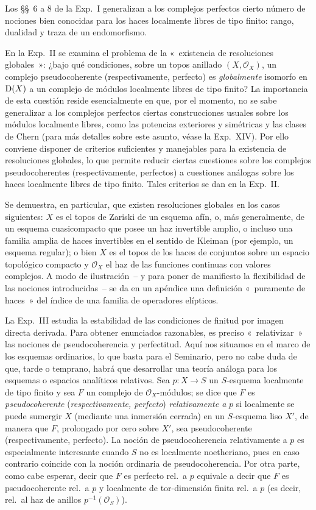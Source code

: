 Los §§~6 a 8 de la Exp.\ I generalizan a los complejos perfectos cierto número de nociones bien conocidas para los haces localmente libres de tipo finito: rango, dualidad y traza de un endomorfismo.

En la Exp.\ II se examina el problema de la «~existencia de resoluciones globales~»: ¿bajo qué condiciones, sobre un topos anillado \((X,\mathcal O_X)\), un complejo pseudocoherente (respectivamente, perfecto) es \emph{globalmente} isomorfo en \(\mathrm D(X)\) a un complejo de módulos localmente libres de tipo finito? La importancia de esta cuestión reside esencialmente en que, por el momento, no se sabe generalizar a los complejos perfectos ciertas construcciones usuales sobre los módulos localmente libres, como las potencias exteriores y simétricas y las clases de Chern (para más detalles sobre este asunto, véase la Exp.\ XIV). Por ello conviene disponer de criterios suficientes y manejables para la existencia de resoluciones globales, lo que permite reducir ciertas cuestiones sobre los complejos pseudocoherentes (respectivamente, perfectos) a cuestiones análogas sobre los haces localmente libres de tipo finito. Tales criterios se dan en la Exp.\ II.

Se demuestra, en particular, que existen resoluciones globales en los casos siguientes: \(X\) es el topos de Zariski de un esquema afín, o, más generalmente, de un esquema cuasicompacto que posee un haz invertible amplio, o incluso una familia amplia de haces invertibles en el sentido de Kleiman (por ejemplo, un esquema regular); o bien \(X\) es el topos de los haces de conjuntos sobre un espacio topológico compacto y \(\mathcal O_X\) el haz de las funciones continuas con valores complejos. A modo de ilustración~-- y para poner de manifiesto la flexibilidad de las nociones introducidas~-- se da en un apéndice una definición «~puramente de haces~» del índice de una familia de operadores elípticos.

La Exp.\ III estudia la estabilidad de las condiciones de finitud por imagen directa derivada. Para obtener enunciados razonables, es preciso «~relativizar~» las nociones de pseudocoherencia y perfectitud. Aquí nos situamos en el marco de los esquemas ordinarios, lo que basta para el Seminario, pero no cabe duda de que, tarde o temprano, habrá que desarrollar una teoría análoga para los esquemas o espacios analíticos relativos. Sea \(p:X\to S\) un \(S\)-esquema localmente de tipo finito y sea \(F\) un complejo de \(\mathcal O_X\)-módulos; se dice que \(F\) es \emph{pseudocoherente} (\emph{respectivamente, perfecto}) \emph{relativamente a} \(p\) si localmente se puede sumergir \(X\) (mediante una inmersión cerrada) en un \(S\)-esquema liso \(X'\), de manera que \(F\), prolongado por cero sobre \(X'\), sea pseudocoherente (respectivamente, perfecto). La noción de pseudocoherencia relativamente a \(p\) es especialmente interesante cuando \(S\) no es localmente noetheriano, pues en caso contrario coincide con la noción ordinaria de pseudocoherencia. Por otra parte, como cabe esperar, decir que \(F\) es perfecto rel.\ a \(p\) equivale a decir que \(F\) es pseudocoherente rel.\ a \(p\) y localmente de tor-dimensión finita rel.\ a \(p\) (es decir, rel.\ al haz de anillos \(p^{-1}(\mathcal O_S)\)).

